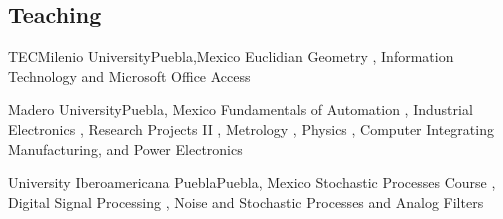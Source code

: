 \documentclass[10pt,a4paper,sans]{moderncv}
\begin{document}
\subsection{Teaching}

{TECMilenio University}{Puebla,Mexico}{}
{ Euclidian Geometry 
 \href{https://sites.google.com/site/perezxochicale/teaching/euclidean-geometry}{\faGlobe},
Information Technology \href{https://sites.google.com/site/perezxochicale/teaching/iit}{\faGlobe} and
Microsoft Office Access \href{https://sites.google.com/site/perezxochicale/teaching/moa}{\faGlobe}
}

{Madero University}{Puebla, Mexico}{}
{Fundamentals of Automation 
\href{https://sites.google.com/site/perezxochicale/digital-electronics}{\faGlobe}, 
Industrial Electronics \href{https://sites.google.com/site/perezxochicale/ie}{\faGlobe}, 
Research Projects II \href{https://sites.google.com/site/perezxochicale/latex/thesistemplate}{\faGlobe}, 
Metrology \href{https://sites.google.com/site/perezxochicale/metrology}{\faGlobe}, 
Physics \href{http://goo.gl/fffnG}{\faGlobe}, 
Computer Integrating Manufacturing, and Power Electronics
}


{University Iberoamericana Puebla}{Puebla, Mexico}{}
{Stochastic Processes Course 
\href{https://sites.google.com/site/perezxochicale/stochastic-processes-course}{\faGlobe}, 
Digital Signal Processing 
\href{https://sites.google.com/site/perezxochicale/digital-signal-processing-course}{\faGlobe}, 
Noise and Stochastic Processes and Analog Filters 
}
\end{document}
